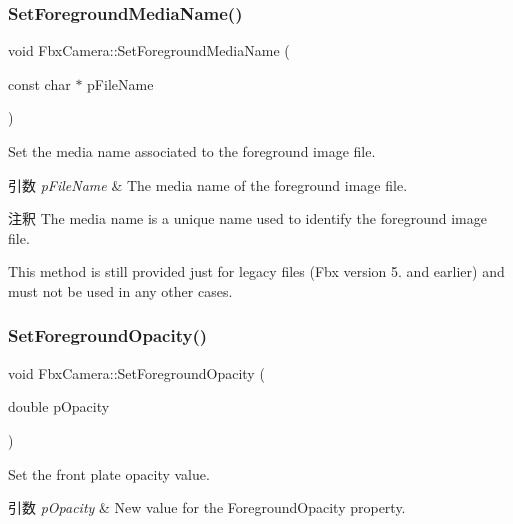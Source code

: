 \subsubsection{\texorpdfstring{Set\+Foreground\+Media\+Name()}{SetForegroundMediaName()}}
{\footnotesize\ttfamily void Fbx\+Camera\+::\+Set\+Foreground\+Media\+Name (\begin{DoxyParamCaption}\item[{const char $\ast$}]{p\+File\+Name }\end{DoxyParamCaption})}

Set the media name associated to the foreground image file. 
\begin{DoxyParams}{引数}
{\em p\+File\+Name} & The media name of the foreground image file. \\
\hline
\end{DoxyParams}
\begin{DoxyRemark}{注釈}
The media name is a unique name used to identify the foreground image file. 

This method is still provided just for legacy files (Fbx version 5. and earlier) and must not be used in any other cases. 
\end{DoxyRemark}
\mbox{\label{class_fbx_camera_a73791e6dcfac8f1495c061cc572b3ef5}} 
\subsubsection{\texorpdfstring{Set\+Foreground\+Opacity()}{SetForegroundOpacity()}}
{\footnotesize\ttfamily void Fbx\+Camera\+::\+Set\+Foreground\+Opacity (\begin{DoxyParamCaption}\item[{double}]{p\+Opacity }\end{DoxyParamCaption})}

Set the front plate opacity value. 
\begin{DoxyParams}{引数}
{\em p\+Opacity} & New value for the Foreground\+Opacity property. \\
\hline
\end{DoxyParams}
\mbox{\label{class_fbx_camera_a750d8a45be5fcaf020b6287ef9867f42}} 
